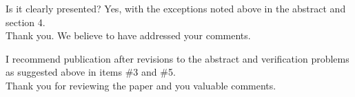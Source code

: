 \documentclass{article}
\newcommand{\tcr}[1]{\textcolor{red}{#1}}
\begin{document}
{\color{blue}
Is it clearly presented?
Yes, with the exceptions noted above in the abstract and section 4. \\
}
Thank you. We believe to have addressed your comments.
\bigskip

%

{\color{blue}
I recommend publication after revisions to the abstract and verification problems as suggested above in items \#3 and \#5. \\
}
Thank you for reviewing the paper and you valuable comments.
\end{document}
